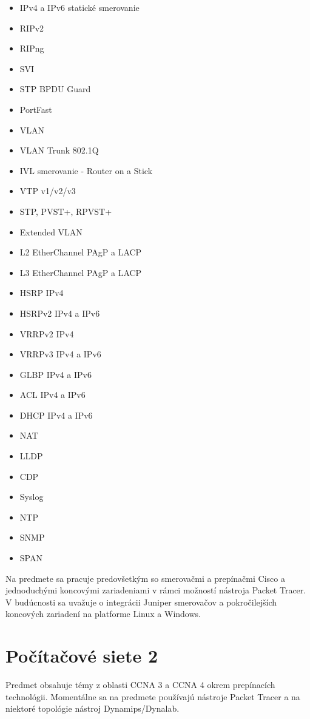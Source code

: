 \begin{itemize}
    \item IPv4 a IPv6 statické smerovanie
    \item RIPv2
    \item RIPng
    \item SVI
    \item STP BPDU Guard
    \item PortFast
    \item VLAN
    \item VLAN Trunk 802.1Q
    \item IVL smerovanie - Router on a Stick
    \item VTP v1/v2/v3
    \item STP, PVST+, RPVST+
    \item Extended VLAN
    \item L2 EtherChannel PAgP a LACP
    \item L3 EtherChannel PAgP a LACP
    \item HSRP IPv4 
    \item HSRPv2 IPv4 a IPv6 
    \item VRRPv2 IPv4 
    \item VRRPv3 IPv4 a IPv6 
    \item GLBP IPv4 a IPv6 
    \item ACL IPv4 a IPv6 
    \item DHCP IPv4 a IPv6 
    \item NAT
    \item LLDP
    \item CDP
    \item Syslog
    \item NTP
    \item SNMP
    \item SPAN
\end{itemize}

Na predmete sa pracuje predovšetkým so smerovačmi a prepínačmi Cisco a jednoduchými koncovými zariadeniami v rámci možností nástroja Packet Tracer. V budúcnosti sa uvažuje o integrácii Juniper smerovačov a pokročilejších koncových zariadení na platforme Linux a Windows.




\section{Počítačové siete 2}

Predmet obsahuje témy z oblasti CCNA 3 a CCNA 4 okrem prepínacích technológii. Momentálne sa na predmete používajú nástroje Packet Tracer a na niektoré topológie nástroj Dynamips/Dynalab.

